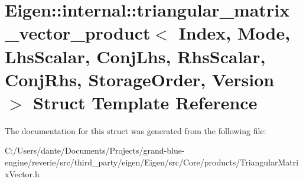 \hypertarget{struct_eigen_1_1internal_1_1triangular__matrix__vector__product}{}\section{Eigen\+::internal\+::triangular\+\_\+matrix\+\_\+vector\+\_\+product$<$ Index, Mode, Lhs\+Scalar, Conj\+Lhs, Rhs\+Scalar, Conj\+Rhs, Storage\+Order, Version $>$ Struct Template Reference}
\label{struct_eigen_1_1internal_1_1triangular__matrix__vector__product}


The documentation for this struct was generated from the following file\+:\begin{DoxyCompactItemize}
\item 
C\+:/\+Users/dante/\+Documents/\+Projects/grand-\/blue-\/engine/reverie/src/third\+\_\+party/eigen/\+Eigen/src/\+Core/products/Triangular\+Matrix\+Vector.\+h\end{DoxyCompactItemize}
